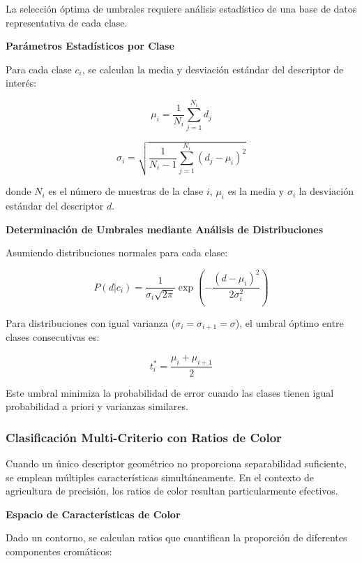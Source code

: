La selección óptima de umbrales requiere análisis estadístico de una base de datos representativa de cada clase.

\textbf{Parámetros Estadísticos por Clase}

Para cada clase $c_i$, se calculan la media y desviación estándar del descriptor de interés:

\begin{equation}
\mu_i = \frac{1}{N_i}\sum_{j=1}^{N_i} d_j
\end{equation}

\begin{equation}
\sigma_i = \sqrt{\frac{1}{N_i-1}\sum_{j=1}^{N_i}(d_j - \mu_i)^2}
\end{equation}

donde $N_i$ es el número de muestras de la clase $i$, $\mu_i$ es la media y $\sigma_i$ la desviación estándar del descriptor $d$.

\textbf{Determinación de Umbrales mediante Análisis de Distribuciones}

Asumiendo distribuciones normales para cada clase:

\begin{equation}
P(d|c_i) = \frac{1}{\sigma_i\sqrt{2\pi}} \exp\left(-\frac{(d-\mu_i)^2}{2\sigma_i^2}\right)
\end{equation}

Para distribuciones con igual varianza ($\sigma_i = \sigma_{i+1} = \sigma$), el umbral óptimo entre clases consecutivas es:

\begin{equation}
t_i^* = \frac{\mu_i + \mu_{i+1}}{2}
\end{equation}

Este umbral minimiza la probabilidad de error cuando las clases tienen igual probabilidad a priori y varianzas similares.

\subsubsection{Clasificación Multi-Criterio con Ratios de Color}

Cuando un único descriptor geométrico no proporciona separabilidad suficiente, se emplean múltiples características simultáneamente. En el contexto de agricultura de precisión, los ratios de color resultan particularmente efectivos.

\textbf{Espacio de Características de Color}

Dado un contorno, se calculan ratios que cuantifican la proporción de diferentes componentes cromáticos:

